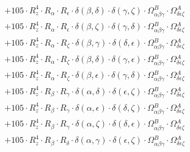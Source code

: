 \documentclass{article}
\begin{document}
\begin{equation}
\begin{array}{c}
 \\[0.2em] 		 + 105 \cdot R_{z}^{4} \cdot R_{\alpha{}} \cdot R_{\epsilon{}} \cdot \delta{}\left(\beta{}, \delta{}\right) \cdot \delta{}\left(\gamma{}, \zeta{}\right) \cdot \Omega{}^{B}_{\alpha{}\beta{}\gamma{}} \cdot \Omega{}^{A}_{\delta{}\epsilon{}\zeta{}} 
 \\[0.2em] 		 + 105 \cdot R_{z}^{4} \cdot R_{\alpha{}} \cdot R_{\epsilon{}} \cdot \delta{}\left(\beta{}, \zeta{}\right) \cdot \delta{}\left(\gamma{}, \delta{}\right) \cdot \Omega{}^{B}_{\alpha{}\beta{}\gamma{}} \cdot \Omega{}^{A}_{\delta{}\epsilon{}\zeta{}} 
 \\[0.2em] 		 + 105 \cdot R_{z}^{4} \cdot R_{\alpha{}} \cdot R_{\zeta{}} \cdot \delta{}\left(\beta{}, \gamma{}\right) \cdot \delta{}\left(\delta{}, \epsilon{}\right) \cdot \Omega{}^{B}_{\alpha{}\beta{}\gamma{}} \cdot \Omega{}^{A}_{\delta{}\epsilon{}\zeta{}} 
 \\[0.2em] 		 + 105 \cdot R_{z}^{4} \cdot R_{\alpha{}} \cdot R_{\zeta{}} \cdot \delta{}\left(\beta{}, \delta{}\right) \cdot \delta{}\left(\gamma{}, \epsilon{}\right) \cdot \Omega{}^{B}_{\alpha{}\beta{}\gamma{}} \cdot \Omega{}^{A}_{\delta{}\epsilon{}\zeta{}} 
 \\[0.2em] 		 + 105 \cdot R_{z}^{4} \cdot R_{\alpha{}} \cdot R_{\zeta{}} \cdot \delta{}\left(\beta{}, \epsilon{}\right) \cdot \delta{}\left(\gamma{}, \delta{}\right) \cdot \Omega{}^{B}_{\alpha{}\beta{}\gamma{}} \cdot \Omega{}^{A}_{\delta{}\epsilon{}\zeta{}} 
 \\[0.2em] 		 + 105 \cdot R_{z}^{4} \cdot R_{\beta{}} \cdot R_{\gamma{}} \cdot \delta{}\left(\alpha{}, \delta{}\right) \cdot \delta{}\left(\epsilon{}, \zeta{}\right) \cdot \Omega{}^{B}_{\alpha{}\beta{}\gamma{}} \cdot \Omega{}^{A}_{\delta{}\epsilon{}\zeta{}} 
 \\[0.2em] 		 + 105 \cdot R_{z}^{4} \cdot R_{\beta{}} \cdot R_{\gamma{}} \cdot \delta{}\left(\alpha{}, \epsilon{}\right) \cdot \delta{}\left(\delta{}, \zeta{}\right) \cdot \Omega{}^{B}_{\alpha{}\beta{}\gamma{}} \cdot \Omega{}^{A}_{\delta{}\epsilon{}\zeta{}} 
 \\[0.2em] 		 + 105 \cdot R_{z}^{4} \cdot R_{\beta{}} \cdot R_{\gamma{}} \cdot \delta{}\left(\alpha{}, \zeta{}\right) \cdot \delta{}\left(\delta{}, \epsilon{}\right) \cdot \Omega{}^{B}_{\alpha{}\beta{}\gamma{}} \cdot \Omega{}^{A}_{\delta{}\epsilon{}\zeta{}} 
 \\[0.2em] 		 + 105 \cdot R_{z}^{4} \cdot R_{\beta{}} \cdot R_{\delta{}} \cdot \delta{}\left(\alpha{}, \gamma{}\right) \cdot \delta{}\left(\epsilon{}, \zeta{}\right) \cdot \Omega{}^{B}_{\alpha{}\beta{}\gamma{}} \cdot \Omega{}^{A}_{\delta{}\epsilon{}\zeta{}} 

\end{array}
\end{equation}
\end{document}
